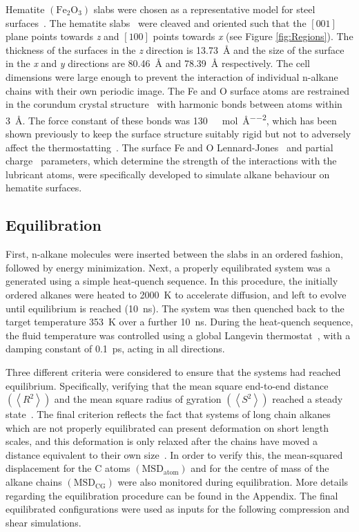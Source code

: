 \documentclass[5p]{elsarticle}
\begin{document}
Hematite $\left(\text{Fe}_2\text{O}_3\right)$ slabs were chosen as a representative model for steel surfaces~\cite{Oh1998}. The hematite  slabs~\cite{Maslen1994} were cleaved and oriented such that the $\left[001\right]$ plane points towards \emph{z} and $\left[100\right]$ points towards \emph{x} (see Figure \ref{fig:Regions}). The thickness of the surfaces in the \emph{z} direction is \SI{13.73}{\angstrom} and the size of the surface in the \emph{x} and \emph{y} directions are \SI{80.46}{\angstrom} and \SI{78.39}{\angstrom} respectively. The cell dimensions were large enough to prevent the interaction of individual n-alkane chains with their own periodic image. The Fe and O surface atoms are restrained in the corundum crystal structure~\cite{Maslen1994} with harmonic bonds between atoms within \SI{3}{\angstrom}. The force constant of these bonds was  \SI{130}{\kilo\calorie\per\mol\per\angstrom\squared}, which has been shown previously to keep the surface structure suitably rigid but not to adversely affect the thermostatting~\cite{Berro2010}. The surface Fe and O Lennard-Jones~\cite{Savio2012} and partial charge~\cite{Berro2010} parameters, which determine the strength of the interactions with the lubricant atoms, were specifically developed to simulate alkane behaviour on hematite surfaces.

\subsection{Equilibration}

First, n-alkane molecules were inserted between the slabs in an ordered fashion, followed by energy minimization. Next, a properly equilibrated system was a generated using a simple heat-quench sequence. In this procedure, the initially ordered alkanes were heated to \SI{2000}{\kelvin} to accelerate diffusion, and left to evolve until equilibrium is reached (\SI{10}{\nano\second}). The system was then quenched back to the target temperature \SI{353}{\kelvin} over a further \SI{10}{\nano\second}. During the heat-quench sequence, the fluid temperature was controlled using a global Langevin thermostat~\cite{Schneider1978}, with a damping constant of \SI{0.1}{\pico\second}, acting in all directions.

Three different criteria were considered to ensure that the systems had reached equilibrium. Specifically, verifying that the mean square end-to-end distance $\left(\left< R^2 \right> \right)$ and the mean square radius of gyration $\left(\left< S^2 \right> \right)$ reached a steady state~\cite{Brown1994}. The final criterion reflects the fact that systems of long chain alkanes which are not properly equilibrated can present  deformation  on  short  length  scales,  and  this  deformation is only relaxed after the chains have moved a distance equivalent to their own size~\cite{Auhl2003}. In order to verify this, the mean-squared displacement for the C atoms $\left(\text{MSD}_{\text{atom}}\right)$ and for the centre of mass of the alkane chains $\left(\text{MSD}_{\text{CG}}\right)$ were also monitored during equilibration. More details regarding the equilibration procedure can be found in the Appendix. The final equilibrated configurations were used as inputs for the following compression and shear simulations. 
\end{document}
